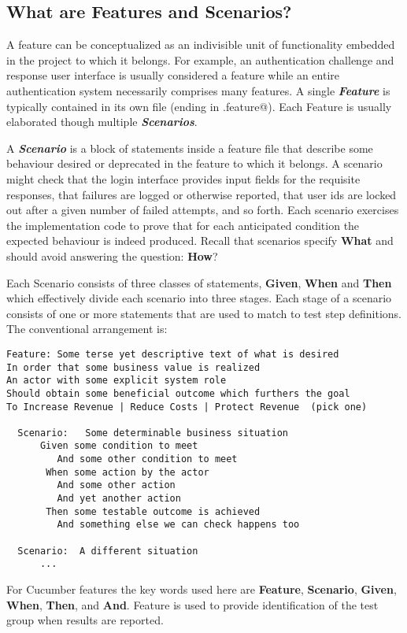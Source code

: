 \documentclass[10pt]{book}
\begin{document}
\subsection{What are Features and Scenarios?}

A feature can be conceptualized as an indivisible unit of functionality embedded in the project to which it belongs.  For example, an authentication challenge and response user interface is usually considered a feature while an entire authentication system necessarily comprises many features.   A single \textbf{\emph{Feature}} is typically contained in its own file (ending in \verb@.feature@).  Each Feature is usually elaborated though multiple \textbf{\emph{Scenarios}}.

A \textbf{\emph{Scenario}} is a block of statements inside a feature file that describe some behaviour desired or deprecated in the feature to which it belongs.  A scenario might check that the login interface provides input fields for the requisite responses, that failures are logged or otherwise reported, that user ids are locked out after a given number of failed attempts, and so forth.  Each scenario exercises the implementation code to prove that for each anticipated condition the expected behaviour is indeed produced.  Recall that scenarios specify \textbf{What} and should avoid answering the question: \textbf{How}?

Each Scenario consists of three classes of statements, \textbf{Given}, \textbf{When} and \textbf{Then} which effectively divide each scenario into three stages.  Each stage of a scenario consists of one or more statements that are used to match to test step definitions. The conventional arrangement is:

\begin{verbatim}
Feature: Some terse yet descriptive text of what is desired
In order that some business value is realized
An actor with some explicit system role
Should obtain some beneficial outcome which furthers the goal
To Increase Revenue | Reduce Costs | Protect Revenue  (pick one)

  Scenario:   Some determinable business situation
      Given some condition to meet
         And some other condition to meet
       When some action by the actor
         And some other action
         And yet another action
       Then some testable outcome is achieved
         And something else we can check happens too

  Scenario:  A different situation
      ...

\end{verbatim}
For Cucumber features the key words used here are \textbf{Feature}, \textbf{Scenario}, \textbf{Given}, \textbf{When}, \textbf{Then}, and \textbf{And}.  Feature is used to provide identification of the test group when results are reported.
\end{document}
